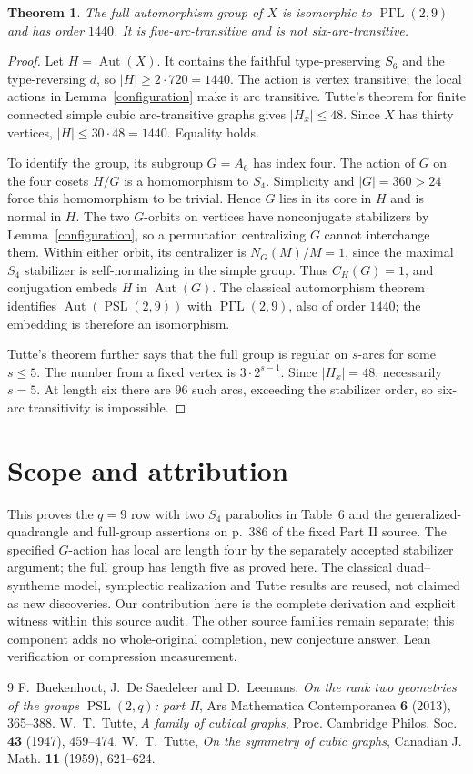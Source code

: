 \documentclass[11pt]{article}
\newtheorem{theorem}[lemma]{Theorem}
\newcommand{\Aut}{\operatorname{Aut}}
\newcommand{\PSL}{\operatorname{PSL}}
\newcommand{\PGammaL}{\operatorname{P\Gamma L}}
\begin{document}
\begin{theorem}\label{full}
The full automorphism group of $X$ is isomorphic to
$\PGammaL(2,9)$ and has order $1440$. It is five-arc-transitive
and is not six-arc-transitive.
\end{theorem}
\begin{proof}
Let $H=\Aut(X)$. It contains the faithful type-preserving $S_6$
and the type-reversing $d$, so $|H|\ge2\cdot720=1440$.
The action is vertex transitive; the local actions in
Lemma~\ref{configuration} make it arc transitive. Tutte's theorem
for finite connected simple cubic arc-transitive graphs gives
$|H_x|\le48$. Since $X$ has thirty vertices,
$|H|\le30\cdot48=1440$. Equality holds.

To identify the group, its subgroup $G=A_6$ has index four. The
action of $G$ on the four cosets $H/G$ is a homomorphism to $S_4$.
Simplicity and $|G|=360>24$ force this homomorphism to be trivial.
Hence $G$ lies in its core in $H$ and is normal in $H$.
The two $G$-orbits on vertices have nonconjugate stabilizers by
Lemma~\ref{configuration}, so a permutation centralizing $G$ cannot
interchange them. Within either orbit, its centralizer is
$N_G(M)/M=1$, since the maximal $S_4$ stabilizer is self-normalizing
in the simple group. Thus $C_H(G)=1$, and conjugation embeds $H$
in $\Aut(G)$. The classical automorphism theorem identifies
$\Aut(\PSL(2,9))$ with $\PGammaL(2,9)$, also of order $1440$;
the embedding is therefore an isomorphism.

Tutte's theorem further says that the full group is regular on
$s$-arcs for some $s\le5$. The number from a fixed vertex is
$3\cdot2^{s-1}$. Since $|H_x|=48$, necessarily $s=5$.
At length six there are $96$ such arcs, exceeding the stabilizer
order, so six-arc transitivity is impossible.
\end{proof}

\section{Scope and attribution}
This proves the $q=9$ row with two $S_4$ parabolics in Table~6 and
the generalized-quadrangle and full-group assertions on p.~386 of
the fixed Part II source. The specified $G$-action has local arc
length four by the separately accepted stabilizer argument; the full
group has length five as proved here. The classical duad--syntheme
model, symplectic realization and Tutte results are reused, not
claimed as new discoveries. Our contribution here is the complete
derivation and explicit witness within this source audit.
The other source families remain separate; this component adds no
whole-original completion, new conjecture answer, Lean verification
or compression measurement.

\begin{thebibliography}{9}
 F.~Buekenhout, J.~De Saedeleer and D.~Leemans,
\emph{On the rank two geometries of the groups $\PSL(2,q)$: part II},
Ars Mathematica Contemporanea \textbf{6} (2013), 365--388.
 W.~T.~Tutte, \emph{A family of cubical graphs},
Proc. Cambridge Philos. Soc. \textbf{43} (1947), 459--474.
 W.~T.~Tutte, \emph{On the symmetry of cubic graphs},
Canadian J. Math. \textbf{11} (1959), 621--624.
\end{thebibliography}
\end{document}
